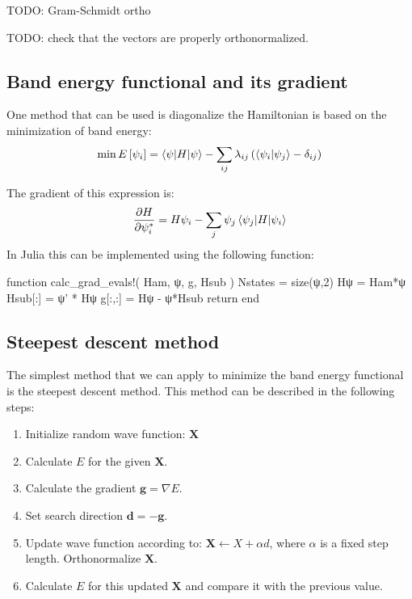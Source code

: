 TODO: Gram-Schmidt ortho

TODO: check that the vectors are properly orthonormalized.


\subsection{Band energy functional and its gradient}

One method that can be used is diagonalize the Hamiltonian is based on the minimization
of band energy:
\begin{equation}
\min E\left[{\psi_{i}}\right] = \braket{\psi | H | \psi} - \sum_{ij}\lambda_{ij}\left(
\braket{ \psi_{i} | \psi_{j} } - \delta_{ij}
\right)
\end{equation}

The gradient of this expression is:
\begin{equation}
\frac{\partial H}{\partial \psi^{*}_{i}} = H\psi_{i} -
\sum_{j} \psi_{j} \braket{\psi_{j} | H | \psi_{i}}
\end{equation}
%
In Julia this can be implemented using the following function:
%
\begin{juliacode}
function calc_grad_evals!( Ham, ψ, g, Hsub )
  Nstates = size(ψ,2)
  Hψ = Ham*ψ
  Hsub[:] = ψ' * Hψ
  g[:,:] = Hψ - ψ*Hsub
  return
end
\end{juliacode}

\subsection{Steepest descent method}

The simplest method that we can apply to minimize the band energy functional is
the steepest descent method. This method can be described in the following steps:
\begin{enumerate}
\item Initialize random wave function: $\mathbf{X}$
\item Calculate $E$ for the given $\mathbf{X}$.
\item Calculate the gradient $\mathbf{g} = \nabla E$.
\item Set search direction $\mathbf{d} = -\mathbf{g}$.
\item Update wave function according to: $\mathbf{X} \leftarrow X + \alpha d$, where $\alpha$ is
a fixed step length. Orthonormalize $\mathbf{X}$.
\item Calculate $E$ for this updated $\mathbf{X}$ and compare it with the previous value.
\end{enumerate}

